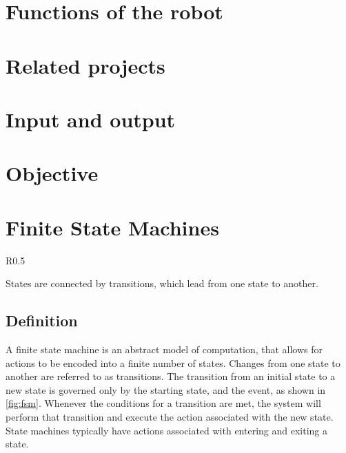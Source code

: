 \documentclass[\rootfolder/main.tex]{subfiles}
\begin{document}
\section{Functions of the robot}

\section{Related projects}

\section{Input and output}

\section{Objective}




\section{Finite State Machines}

\begin{wrapfigure}{R}{0.5\columnwidth}
    \caption{An example of a simple state machine.}
    \label{fig:fsm}
\end{wrapfigure}

States are connected by transitions, which lead from one state to another.


\subsection{Definition}

A finite state machine is an abstract model of computation, that allows for actions to be encoded into a finite number of states.
Changes from one state to another are referred to as transitions.
The transition from an initial state to a new state is governed only by the starting state, and the event, as shown in \cref{fig:fsm}.
Whenever the conditions for a transition are met, the system will perform that transition and execute the action associated with the new state.
State machines typically have actions associated with entering and exiting a state.
\end{document}
